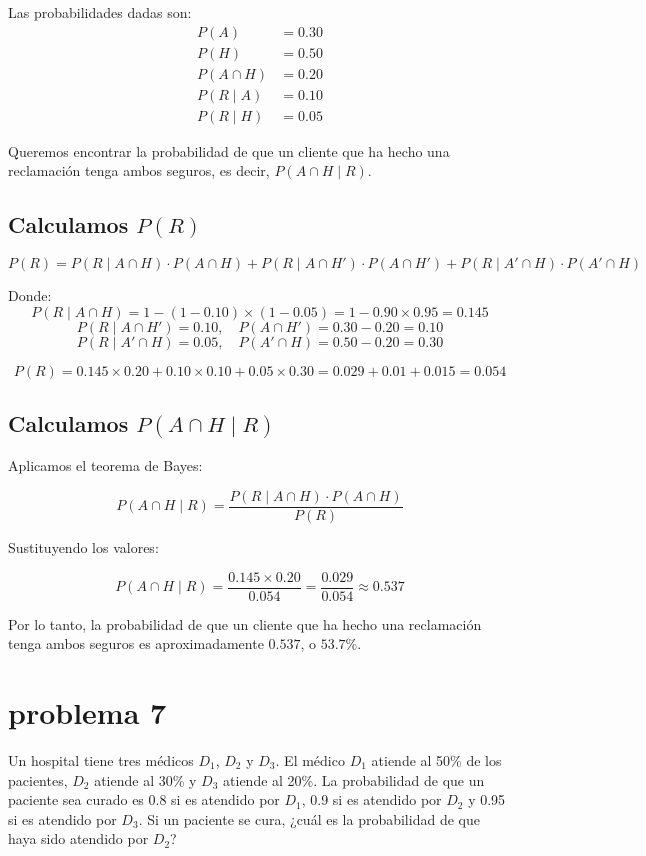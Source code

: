 \documentclass[12pt,a4paper]{article}
\begin{document}
Las probabilidades dadas son:
\begin{align*}
P(A) &= 0.30 \\
P(H) &= 0.50 \\
P(A \cap H) &= 0.20 \\
P(R \mid A) &= 0.10 \\
P(R \mid H) &= 0.05
\end{align*}

Queremos encontrar la probabilidad de que un cliente que ha hecho una reclamación tenga ambos seguros, es decir, \( P(A \cap H \mid R) \).

\subsection*{ Calculamos \( P(R) \)}

\[
P(R) = P(R \mid A \cap H) \cdot P(A \cap H) + P(R \mid A \cap H') \cdot P(A \cap H') + P(R \mid A' \cap H) \cdot P(A' \cap H)
\]

Donde:
\[
P(R \mid A \cap H) = 1 - (1 - 0.10) \times (1 - 0.05) = 1 - 0.90 \times 0.95 = 0.145
\]
\[
P(R \mid A \cap H') = 0.10, \quad P(A \cap H') = 0.30 - 0.20 = 0.10
\]
\[
P(R \mid A' \cap H) = 0.05, \quad P(A' \cap H) = 0.50 - 0.20 = 0.30
\]

\[
P(R) = 0.145 \times 0.20 + 0.10 \times 0.10 + 0.05 \times 0.30 = 0.029 + 0.01 + 0.015 = 0.054
\]

\subsection*{Calculamos \( P(A \cap H \mid R) \)}

Aplicamos el teorema de Bayes:

\[
P(A \cap H \mid R) = \frac{P(R \mid A \cap H) \cdot P(A \cap H)}{P(R)}
\]

Sustituyendo los valores:

\[
P(A \cap H \mid R) = \frac{0.145 \times 0.20}{0.054} = \frac{0.029}{0.054} \approx 0.537
\]

Por lo tanto, la probabilidad de que un cliente que ha hecho una reclamación tenga ambos seguros es aproximadamente \( 0.537 \), o \( 53.7\% \).

\section*{problema 7}
Un hospital tiene tres médicos \( D_1 \), \( D_2 \) y \( D_3 \). El médico \( D_1 \) atiende al 50\% de los pacientes, \( D_2 \) atiende al 30\% y \( D_3 \) atiende al 20\%. La probabilidad de que un paciente sea curado es 0.8 si es atendido por \( D_1 \), 0.9 si es atendido por \( D_2 \) y 0.95 si es atendido por \( D_3 \). Si un paciente se cura, ¿cuál es la probabilidad de que haya sido atendido por \( D_2 \)?
\end{document}
